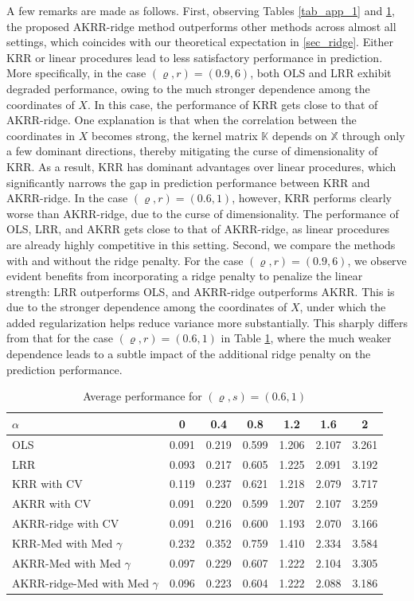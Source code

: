 \documentclass[11pt,twoside]{article}
\def\KK{\mathbb{K}}
\def\XX{\mathbb{X}}
\begin{document}
A few remarks are made as follows. First, 
observing  Tables  \ref{tab_app_1} and \ref{tab_app_2},
the proposed 
AKRR-ridge method 
outperforms other methods across almost all settings, which coincides with our theoretical expectation in \cref{sec_ridge}.
Either KRR or linear procedures lead to less satisfactory performance in prediction.  
More specifically, in the case $(\varrho, r) = (0.9, 6)$, both OLS and LRR exhibit degraded performance, owing to the much stronger dependence among the coordinates of $X$. In this case, 
the performance of  KRR gets close to that of AKRR-ridge. 
One explanation is that when the correlation between the coordinates in $X$ becomes strong, the kernel matrix $\KK$  depends on $\XX$  through only a few dominant directions, thereby mitigating the curse of dimensionality of KRR. 
As a result, KRR has dominant advantages over linear procedures, which significantly narrows the gap in prediction performance between KRR and AKRR-ridge.
In the case 
$(\varrho, r) = (0.6, 1)$, however, 
KRR performs clearly worse than AKRR-ridge, due to the curse of dimensionality.  The performance of  OLS,  LRR, and AKRR gets close to that of AKRR-ridge, as linear procedures are already highly competitive in this setting.
Second, we compare the methods with and without the ridge penalty. 
For the case $(\varrho, r) = (0.9, 6)$, we observe evident benefits from incorporating a ridge penalty to penalize the linear strength: LRR  outperforms OLS, and AKRR-ridge outperforms AKRR. This is due to the stronger dependence among the coordinates of $X$, under which the added regularization helps reduce variance more substantially. This sharply differs from that for the case $(\varrho, r) = (0.6, 1)$ in Table \ref{tab_app_2}, 
where the much weaker dependence leads to a subtle impact of the additional ridge penalty on the prediction performance. 
\begin{table}
\centering
\caption{Average performance for 
$(\varrho, s) = (0.6, 1)$
}
\label{tab_app_2} 
\small
\setlength{\tabcolsep}{7pt}
\begin{tabular}{lcccccc}
\toprule
$\alpha$  & 0 & 0.4 & 0.8 & 1.2 & 1.6 & 2 \\
\midrule
OLS          & 0.091 & 0.219 & 0.599 & 1.206 & 2.107 & 3.261 \\
LRR       & 0.093 & 0.217 & 0.605 & 1.225 & 2.091 & 3.192 \\
\midrule
KRR  with CV        & 0.119 & 0.237 & 0.621 & 1.218 & 2.079 & 3.717 \\
AKRR   with CV     & 0.091 & 0.220 & 0.599 & 1.207 & 2.107 & 3.259 \\
AKRR-ridge  with CV   & 0.091 & 0.216 & 0.600 & 1.193 & 2.070 & 3.166 \\
\midrule
KRR-Med  with Med $\gamma$        & 0.232 & 0.352 & 0.759 & 1.410 & 2.334 & 3.584 \\
AKRR-Med   with Med $\gamma$      & 0.097 & 0.229 & 0.607 & 1.222 & 2.104 & 3.305 \\
AKRR-ridge-Med with Med  $\gamma$  & 0.096 & 0.223 & 0.604 & 1.222 & 2.088 & 3.186 \\
\bottomrule
\end{tabular}
\end{table}
\end{document}
